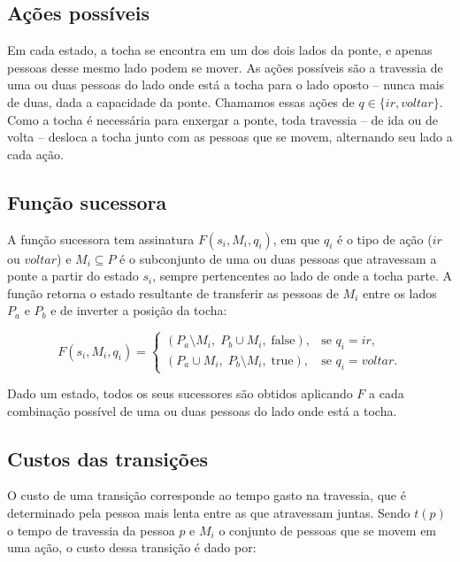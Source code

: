 \subsection{Ações possíveis}

Em cada estado, a tocha se encontra em um dos dois lados da ponte, e apenas
pessoas desse mesmo lado podem se mover. As ações possíveis são a travessia de
uma ou duas pessoas do lado onde está a tocha para o lado oposto -- nunca mais
de duas, dada a capacidade da ponte. Chamamos essas ações de
$q \in \{\mathit{ir}, \mathit{voltar}\}$.
Como a tocha é necessária para enxergar a ponte,
toda travessia -- de ida ou de volta -- desloca a tocha junto com as pessoas
que se movem, alternando seu lado a cada ação.

\subsection{Função sucessora}

A função sucessora tem assinatura $F(s_i, M_i, q_i)$, em que $q_i$ é o tipo de
ação ($\mathit{ir}$ ou $\mathit{voltar}$) e $M_i \subseteq P$ é o subconjunto
de uma ou duas pessoas que atravessam a ponte a partir do estado $s_i$, sempre
pertencentes ao lado de onde a tocha parte. A função retorna o estado
resultante de transferir as pessoas de $M_i$ entre os lados $P_a$ e $P_b$ e de
inverter a posição da tocha:

\begin{equation}
	F(s_i, M_i, q_i) =
	\begin{cases}
		(P_a \setminus M_i,\; P_b \cup M_i,\; \text{false}), & \text{se } q_i = \mathit{ir},     \\
		(P_a \cup M_i,\; P_b \setminus M_i,\; \text{true}),  & \text{se } q_i = \mathit{voltar}.
	\end{cases}
\end{equation}

Dado um estado, todos os seus sucessores são obtidos aplicando $F$ a cada
combinação possível de uma ou duas pessoas do lado onde está a tocha.

\subsection{Custos das transições}

O custo de uma transição corresponde ao tempo gasto na travessia, que é
determinado pela pessoa mais lenta entre as que atravessam juntas.
Sendo $t(p)$ o tempo de travessia da pessoa $p$ e $M_i$ o
conjunto de pessoas que se movem em uma ação, o custo dessa transição é dado
por:


